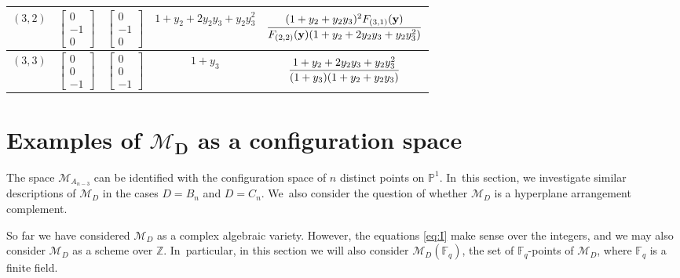 \documentclass[pdftex]{sigma}%
\def\Z{{\mathbb Z}}
\def\F{{\mathbb F}}
\def\M{{\mathcal{M}}}
\def\y{{\mathbf y}}
\renewcommand{\P}{{\mathbb P}}
\numberwithin{equation}{section}
\begin{document}
\begin{Example}
\begin{table}[t!]
\begin{tabular}{c|c|c|c|c}
\hline
$(3,2)$ & $\begin{bmatrix}0\\[-1ex]-1\\[-1ex]0 \end{bmatrix}$ & $\begin{bmatrix}0\\[-1ex]-1\\[-1ex]0 \end{bmatrix}$ & $1 + y_2 + 2y_2y_3 + y_2y_3^2$ & $\dfrac{(1+y_2+y_2y_3)^2 F_{(3,1)}(\y)}{F_{(2,2)}(\y)(1 + y_2 + 2y_2y_3 + y_2y_3^2)}\vphantom{\begin{bmatrix}1\\[-.5ex]0\\[-.5ex]0 \end{bmatrix}}$\\
\hline
$(3,3)$ & $\begin{bmatrix}0\\[-1ex]0\\[-1ex]-1 \end{bmatrix}$ & $\begin{bmatrix}0\\[-1ex]0\\[-1ex]-1 \end{bmatrix}$ & $1+y_3$ & $\dfrac{1 + y_2 + 2y_2y_3 + y_2y_3^2}{(1+y_3)(1+y_2+y_2y_3)}\vphantom{\begin{bmatrix}1\\[-.5ex]0\\[-.5ex]0 \end{bmatrix}}$
\\
\hline
\end{tabular}
\end{table}
\end{Example}

\section[Examples of MD as a configuration space]
{Examples of $\boldsymbol{\M_D}$ as a configuration space}

The space $\M_{A_{n-3}}$ can be identified with the configuration space of $n$ distinct points on $\P^1$. In~this section, we investigate similar descriptions of $\M_D$ in the cases $D=B_n$ and $D=C_n$. We~also consider the question of whether $\M_D$ is a hyperplane arrangement complement.

So far we have considered $\M_D$ as a complex algebraic variety. However, the equations \eqref{eq:I} make sense over the integers, and we may also consider $\M_D$ as a scheme over $\Z$. In~particular, in this section we will also consider $\M_D(\F_q)$, the set of $\F_q$-points of $\M_D$, where $\F_q$ is a finite field.
\end{document}

